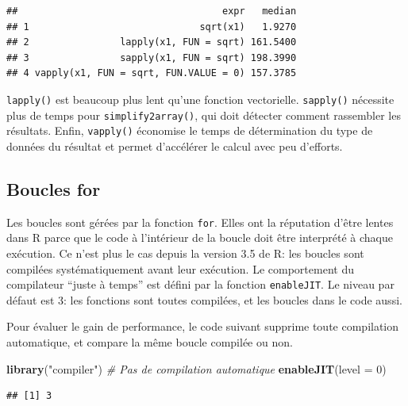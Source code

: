 \documentclass[
  12pt,
  french,
  a4paper,
  extrafontsizes,onecolumn,openright
  ]{memoir}
\newenvironment{Shaded}{\begin{snugshade}}{\end{snugshade}}
\newcommand{\AttributeTok}[1]{\textcolor[rgb]{0.13,0.29,0.53}{#1}}
\newcommand{\CommentTok}[1]{\textcolor[rgb]{0.56,0.35,0.01}{\textit{#1}}}
\newcommand{\DecValTok}[1]{\textcolor[rgb]{0.00,0.00,0.81}{#1}}
\newcommand{\FunctionTok}[1]{\textcolor[rgb]{0.13,0.29,0.53}{\textbf{#1}}}
\newcommand{\NormalTok}[1]{#1}
\newcommand{\StringTok}[1]{\textcolor[rgb]{0.31,0.60,0.02}{#1}}
\newlength{\rf}
\begin{document}
\begin{verbatim}
##                                    expr   median
## 1                              sqrt(x1)   1.9270
## 2                lapply(x1, FUN = sqrt) 161.5400
## 3                sapply(x1, FUN = sqrt) 198.3990
## 4 vapply(x1, FUN = sqrt, FUN.VALUE = 0) 157.3785
\end{verbatim}

\normalsize

\texttt{lapply()} est beaucoup plus lent qu'une fonction vectorielle.
\texttt{sapply()} nécessite plus de temps pour \texttt{simplify2array()}, qui doit détecter comment rassembler les résultats.
Enfin, \texttt{vapply()} économise le temps de détermination du type de données du résultat et permet d'accélérer le calcul avec peu d'efforts.

\subsection{Boucles for}\label{boucles-for}

Les boucles sont gérées par la fonction \texttt{for}.
Elles ont la réputation d'être lentes dans R parce que le code à l'intérieur de la boucle doit être interprété à chaque exécution.
Ce n'est plus le cas depuis la version 3.5 de R: les boucles sont compilées systématiquement avant leur exécution.
Le comportement du compilateur \enquote{juste à temps} est défini par la fonction \texttt{enableJIT}.
Le niveau par défaut est 3: les fonctions sont toutes compilées, et les boucles dans le code aussi.

Pour évaluer le gain de performance, le code suivant supprime toute compilation automatique, et compare la même boucle compilée ou non.

\scriptsize

\begin{Shaded}
\begin{Highlighting}[]
\FunctionTok{library}\NormalTok{(}\StringTok{"compiler"}\NormalTok{)}
\CommentTok{\# Pas de compilation automatique}
\FunctionTok{enableJIT}\NormalTok{(}\AttributeTok{level =} \DecValTok{0}\NormalTok{)}
\end{Highlighting}
\end{Shaded}

\begin{verbatim}
## [1] 3
\end{verbatim}
\end{document}
